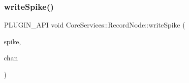 \subsubsection{\texorpdfstring{write\+Spike()}{writeSpike()}}
{\footnotesize\ttfamily P\+L\+U\+G\+I\+N\+\_\+\+A\+PI void Core\+Services\+::\+Record\+Node\+::write\+Spike (\begin{DoxyParamCaption}\item[{const Spike\+Event $\ast$}]{spike,  }\item[{const Spike\+Channel $\ast$}]{chan }\end{DoxyParamCaption})}

